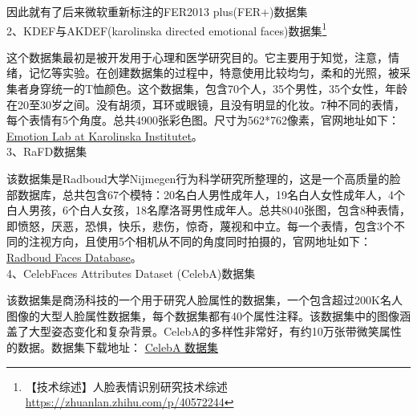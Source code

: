 \begin{table}[]
\caption{FER 2013数据集}
\centering
{}
\label{table:1-2}
\end{table}

因此就有了后来微软重新标注的FER2013 plus(FER+)数据集 \\

2、KDEF与AKDEF(karolinska directed emotional faces)数据集\footnote{【技术综述】人脸表情识别研究技术综述 \quad \url{https://zhuanlan.zhihu.com/p/40572244}}

这个数据集最初是被开发用于心理和医学研究目的。它主要用于知觉，注意，情绪，记忆等实验。在创建数据集的过程中，特意使用比较均匀，柔和的光照，被采集者身穿统一的T恤颜色。这个数据集，包含70个人，35个男性，35个女性，年龄在20至30岁之间。没有胡须，耳环或眼镜，且没有明显的化妆。7种不同的表情，每个表情有5个角度。总共4900张彩色图。尺寸为562*762像素，官网地址如下：\href{https://www.emotionlab.se/publi/}{Emotion Lab at Karolinska Institutet}。\\

3、RaFD数据集

该数据集是Radboud大学Nijmegen行为科学研究所整理的，这是一个高质量的脸部数据库，总共包含67个模特：20名白人男性成年人，19名白人女性成年人，4个白人男孩，6个白人女孩，18名摩洛哥男性成年人。总共8040张图，包含8种表情，即愤怒，厌恶，恐惧，快乐，悲伤，惊奇，蔑视和中立。每一个表情，包含3个不同的注视方向，且使用5个相机从不同的角度同时拍摄的，官网地址如下：\href{http://www.socsci.ru.nl:8180/RaFD2/RaFD?p=main}{Radboud Faces Database}。\\

4、CelebFaces Attributes Dataset (CelebA)数据集

该数据集是商汤科技的一个用于研究人脸属性的数据集，一个包含超过200K名人图像的大型人脸属性数据集，每个数据集都有40个属性注释。该数据集中的图像涵盖了大型姿态变化和复杂背景。CelebA的多样性非常好，有约10万张带微笑属性的数据。数据集下载地址：
\href{https://mp.weixin.qq.com/s?__biz=MzU1NDMwMjE3Mw==&mid=2247484102&idx=1&sn=e6bdde7a694d101e9a335f6b41b1ecc6&chksm=fbe4ed74cc9364629da8d866c6787456863c868adfaceba3fcb9b337fb4e03f37cc3bdb9291f&token=2099057174&lang=zh_CN#rd}{CelebA 数据集}

